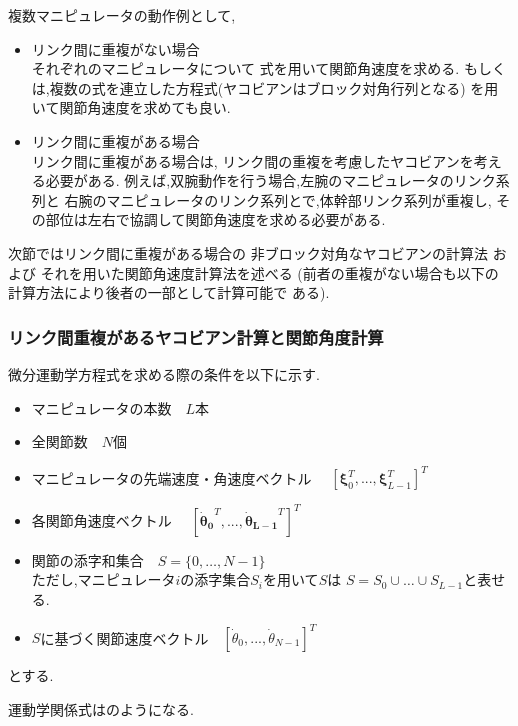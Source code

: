 複数マニピュレータの動作例として,
\begin{itemize}
\item リンク間に重複がない場合\\
それぞれのマニピュレータについて
式を用いて関節角速度を求める.
もしくは,複数の式を連立した方程式(ヤコビアンはブロック対角行列となる)
を用いて関節角速度を求めても良い.
\item リンク間に重複がある場合\\
リンク間に重複がある場合は,
リンク間の重複を考慮したヤコビアンを考える必要がある.
例えば,双腕動作を行う場合,左腕のマニピュレータのリンク系列と
右腕のマニピュレータのリンク系列とで,体幹部リンク系列が重複し,
その部位は左右で協調して関節角速度を求める必要がある.
\end{itemize}
次節ではリンク間に重複がある場合の
非ブロック対角なヤコビアンの計算法
および
それを用いた関節角速度計算法を述べる
(前者の重複がない場合も以下の計算方法により後者の一部として計算可能で
ある).

\subsubsection{リンク間重複があるヤコビアン計算と関節角度計算}
微分運動学方程式を求める際の条件を以下に示す.
\begin{itemize}
\item マニピュレータの本数　$L$本
\item 全関節数　$N$個
\item マニピュレータの先端速度・角速度ベクトル　
$[\bm{\xi}_0^T,...,\bm{\xi}_{L-1}^T]^T$
\item 各関節角速度ベクトル　
$[\bm{\dot{\theta}_0}^T,...,\bm{\dot{\theta}_{L-1}}^T]^T$
\item 関節の添字和集合　$S = \{0,\hdots,N-1\}$\\
ただし,マニピュレータ$i$の添字集合$S_i$を用いて$S$は
$S = S_0 \cup \hdots \cup S_{L-1}$と表せる.
\item $S$に基づく関節速度ベクトル　$[\dot{\theta}_0, ..., \dot{\theta}_{N-1}]^T$
\end{itemize}
とする.

運動学関係式はのようになる.

